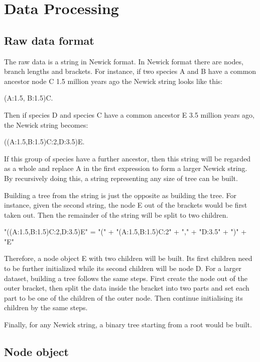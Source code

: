 \documentclass[MSc]{icldt}
\begin{document}
\section{Data Processing}

\subsection{Raw data format}

The raw data is a string in Newick format. In Newick format there are nodes, branch lengths and brackets. For instance, if two species A and B have a common ancestor node C 1.5 million years ago the Newick string looks like this: 
\begin{center}
	(A:1.5, B:1.5)C. 
\end{center}

Then if species D and species C have a common ancestor E 3.5 million years ago, the Newick string becomes: 
\begin{center}
	((A:1.5,B:1.5)C:2,D:3.5)E. 
\end{center}
If this group of species have a further ancestor, then this string will be regarded as a whole and replace A in the first expression to form a larger Newick string. By recursively doing this, a string representing any size of tree can be built.

Building a tree from the string is just the opposite as building the tree. For instance, given the second string, the node E out of the brackets would be first taken out. Then the remainder of the string will be split to two children.

\begin{center}
	"((A:1.5,B:1.5)C:2,D:3.5)E" =  "(" + "(A:1.5,B:1.5)C:2" + "," + "D:3.5" + ")" + "E"
\end{center}

Therefore, a node object E with two children will be built. Its first children need to be further initialized while its second children will be node D. For a larger dataset, building a tree follows the same steps. First create the node out of the outer bracket, then split the data inside the bracket into two parts and set each part to be one of the children of the outer node. Then continue initialising its children by the same steps.

Finally, for any Newick string, a binary tree starting from a root would be built. 

\subsection{Node object}
\end{document}
